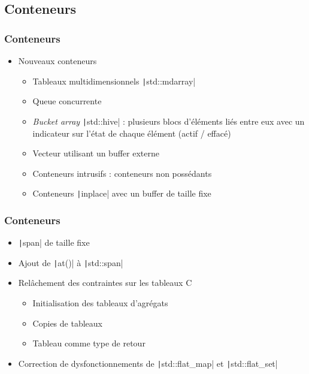 \documentclass[C++.tex]{subfiles}
\begin{document}
\subsection*{Conteneurs}
\begin{frame}[fragile]
	\frametitle{Conteneurs}
	\begin{itemize}
		\item Nouveaux conteneurs
			\begin{itemize}
				\item Tableaux multidimensionnels \texttt|std::mdarray|


				\item Queue concurrente
				\item \textit{Bucket array} \texttt|std::hive| : plusieurs blocs d'éléments liés entre eux avec un indicateur sur l'état de chaque élément (actif / effacé)
				\item Vecteur utilisant un buffer externe
				\item Conteneurs intrusifs : conteneurs non possédants


				\item Conteneurs \texttt|inplace| avec un buffer de taille fixe
			\end{itemize}
		\end{itemize}
\end{frame}

\begin{frame}[fragile]
	\frametitle{Conteneurs}
	\begin{itemize}
		\item \texttt|span| de taille fixe
		\item Ajout de \texttt|at()| à \texttt|std::span|
		\item Relâchement des contraintes sur les tableaux C
		\begin{itemize}
			\item Initialisation des tableaux d'agrégats
			\item Copies de tableaux
			\item Tableau comme type de retour
		\end{itemize}


		\item Correction de dysfonctionnements de \texttt|std::flat_map| et \texttt|std::flat_set| 
	\end{itemize}
\end{frame}
\end{document}
